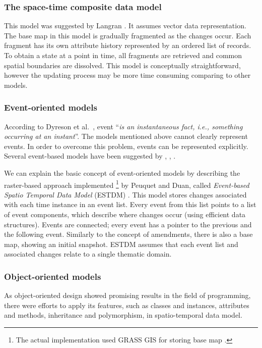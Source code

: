 \documentclass[a4paper,12pt,oneside]{book}
\begin{document}
\subsubsection{The space-time composite data model}
This model was suggested by Langran \cite{langran1988}. It assumes vector data representation.
The base map in this model is gradually fragmented as the changes occur.
Each fragment has its own attribute history represented by an ordered list of records.
To obtain a state at a point in time, all fragments are retrieved and common spatial boundaries are dissolved.
This model is conceptually straightforward, however the updating process may be more time consuming \cite{pelekis2004}
comparing to other models.

\subsubsection{Event-oriented models}
According to Dyreson et al.\ \cite[p.~56]{temporalGlossary}, event ``\emph{is an instantaneous fact, i.e., something occurring at an instant}''.
The models mentioned above cannot clearly represent events.
In order to overcome this problem, events can be represented explicitly.
Several event-based models have been suggested by \cite{claramunt1995managing}, \cite{peuquet1995}, \cite{chen1998event}.

We can explain the basic concept of event-oriented models by describing
the raster-based approach implemented%
\footnote{The actual implementation used GRASS GIS for storing base map \cite{peuquet1995}.}
by Peuquet and Duan, called
\emph{Event-based Spatio Temporal Data Model} (ESTDM)  \cite{peuquet1995}.
This model stores changes associated with each time instance in an event list.
Every event from this list points to a list of event components,
which describe where changes occur (using efficient data structures).
Events are connected; every event has a pointer to the previous and the following event.
Similarly to the concept of amendments, there is also a base map, showing an initial snapshot.
ESTDM assumes that each event list and associated changes relate to a single thematic domain.

\subsubsection{Object-oriented models}
As object-oriented design showed promising results in the field of programming,
there were efforts to apply its features, such as classes and instances, attributes and methods,
inheritance and polymorphism, in spatio-temporal data model.
\end{document}
